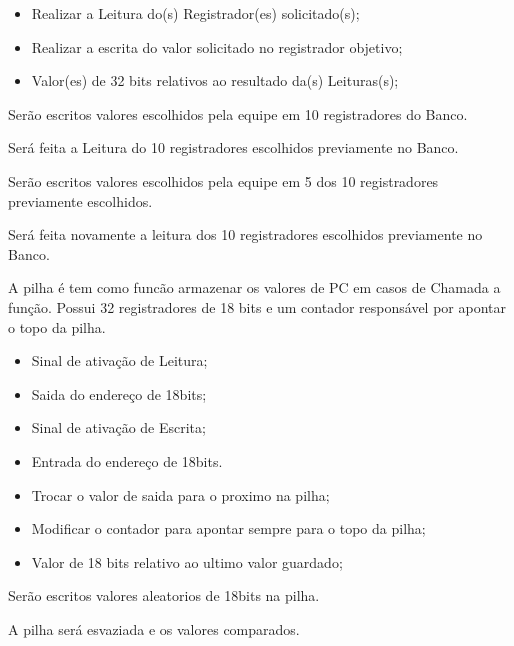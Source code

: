 \documentclass{article}
\begin{document}
  \actions
  \begin{itemize}
     \item Realizar a Leitura do(s) Registrador(es) solicitado(s);
     \item Realizar a escrita do valor solicitado no registrador objetivo;
    \end{itemize}
  
  \results
  	\begin{itemize}
     \item Valor(es) de 32 bits relativos ao resultado da(s) Leituras(s); 
    \end{itemize}
  
  \begin{mainflow}
     \item Serão escritos valores escolhidos pela equipe em 10 registradores do Banco.
     \item Será feita a Leitura do 10 registradores escolhidos previamente no Banco.
     \item Serão escritos valores escolhidos pela equipe em 5 dos 10 registradores previamente escolhidos.
     \item Será feita novamente a leitura dos 10 registradores escolhidos previamente no Banco.
  \end{mainflow}

A pilha é tem como funcão armazenar os valores de PC em casos de Chamada a função. Possui 32 registradores de 18 bits e um contador responsável por apontar o topo da pilha.
  
  	\begin{itemize}
     \item Sinal de ativação de Leitura;
     \item Saida do endereço de 18bits;
     \item Sinal de ativação de Escrita;
     \item Entrada do endereço de 18bits.
     \end{itemize}
    
  \actions
  \begin{itemize}
     \item Trocar o valor de saida para o proximo na pilha;
     \item Modificar o contador para apontar sempre para o topo da pilha;
    \end{itemize}
  
  \results
  	\begin{itemize}
     \item Valor de 18 bits relativo ao ultimo valor guardado; 
    \end{itemize}
  
  \begin{mainflow}
     \item Serão escritos valores aleatorios de  18bits na pilha.
     \item A pilha será esvaziada e os valores comparados.
  \end{mainflow}

% 
% 
\end{document}
